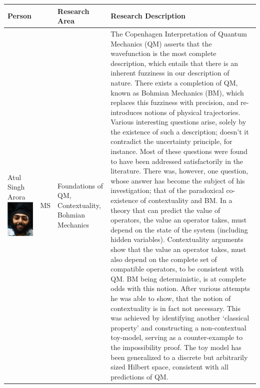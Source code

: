 \documentclass[11pt]{article}
\begin{document}
\begin{center}
\begin{tabular}{llll}
Person &  & Research Area & Research Description\\
\hline
Atul Singh Arora  \includegraphics[width=.9\linewidth]{./images/atul.jpg} & MS & Foundations of QM, Contextuality, Bohmian Mechanics & The Copenhagen Interpretation of Quantum Mechanics (QM) asserts that the wavefunction is the most complete description, which entails that there is an inherent fuzziness in our description of nature. There exists a completion of QM, known as Bohmian Mechanics (BM), which replaces this fuzziness with precision, and re-introduces notions of physical trajectories. Various interesting questions arise, solely by the existence of such a description; doesn't it contradict the uncertainty principle, for instance. Most of these questions were found to have been addressed satisfactorily in the literature. There was, however, one question, whose answer has become the subject of his investigation; that of the paradoxical co-existence of contextuality and BM. In a theory that can predict the value of operators, the value an operator takes, must depend on the state of the system (including hidden variables). Contextuality arguments show that the value an operator takes, must also depend on the complete set of compatible operators, to be consistent with QM. BM being deterministic, is at complete odds with this notion. After various attempts he was able to show, that the notion of contextuality is in fact not necessary. This was achieved by identifying another `classical property' and constructing a non-contextual toy-model, serving as a counter-example to the impossibility proof. The toy model has been generalized to a discrete but arbitrarily sized Hilbert space, consistent with all predictions of QM. 
\end{tabular}
\end{center}
\end{document}
